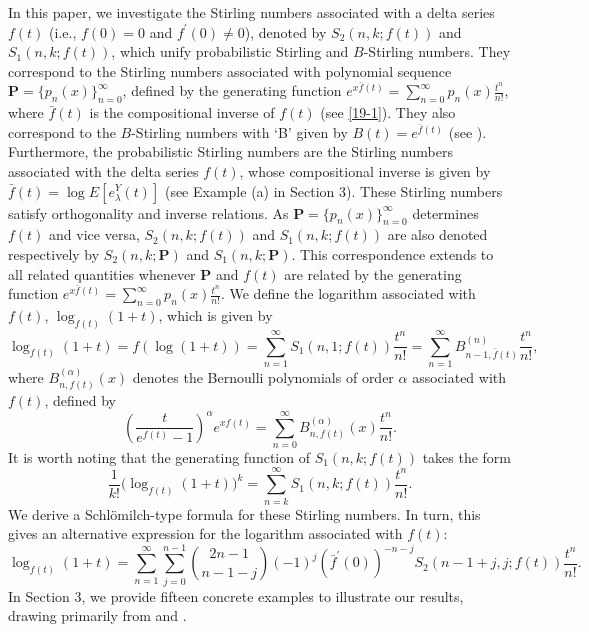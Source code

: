 \documentclass[a4paper,11pt]{amsart}
\begin{document}
In this paper, we investigate the Stirling numbers associated with a delta series $f(t)$ (i.e., $f(0)=0$ and $f^{\prime}(0) \ne 0$), denoted by $S_{2}(n,k; f(t))$ and $S_{1}(n,k; f(t))$, which unify probabilistic Stirling and $B$-Stirling numbers. They correspond to the Stirling numbers associated with polynomial sequence $\mathbf{P}= \{p_{n}(x)\}_{n=0}^{\infty}$, defined by the generating function $e^{x \bar{f}(t)}=\sum_{n=0}^{\infty}p_{n}(x)\frac{t^{n}}{n!}$, where $\bar{f}(t)$ is the compositional inverse of $f(t)$ (see \eqref{19-1}). They also correspond to the $B$-Stirling numbers with `B' given by $B(t)=e^{\bar{f}(t)}$ (see \cite{2}). Furthermore, the probabilistic Stirling numbers are the Stirling numbers associated with the delta series $f(t)$, whose compositional inverse is given by $\bar{f}(t)=\log E[e_{\lambda}^{Y}(t)]$ (see Example (a) in Section 3).
These Stirling numbers satisfy orthogonality and inverse relations. As $\mathbf{P}= \{p_{n}(x)\}_{n=0}^{\infty}$ determines $f(t)$ and vice versa, $S_{2}(n,k; f(t))$ and $S_{1}(n,k; f(t))$ are also denoted respectively by $S_{2}(n,k; \mathbf{P})$ and $S_{1}(n,k; \mathbf{P})$. This correspondence extends to all related quantities whenever $\mathbf{P}$ and $f(t)$ are related by the generating function $e^{x \bar{f}(t)}=\sum_{n=0}^{\infty}p_{n}(x)\frac{t^{n}}{n!}$.
We define the logarithm associated with $f(t)$, $\log_{f(t)}(1+t)$, which is given by
\begin{equation*}
\log_{f(t)}(1+t)=f(\log(1+t))=\sum_{n=1}^{\infty}S_{1}(n,1; f(t))\frac{t^{n}}{n!}=\sum_{n=1}^{\infty}B_{n-1,\bar{f}(t)}^{(n)}\frac{t^{n}}{n!},
\end{equation*}
where $B_{n,f(t)}^{(\alpha)}(x)$ denotes the Bernoulli polynomials of order $\alpha$ associated with $f(t)$, defined by
\begin{equation*}
\left(\frac{t}{e^{f(t)}-1}\right)^{\alpha}e^{xf(t)}=\sum_{n=0}^{\infty}B_{n,f(t)}^{(\alpha)}(x)\frac{t^{n}}{n!}.
\end{equation*}
It is worth noting that the generating function of $S_{1}(n,k; f(t))$ takes the form
\begin{equation*}
\frac{1}{k!}\big(\log_{f(t)}(1+t)\big)^{k}=\sum_{n=k}^{\infty}S_{1}(n,k; f(t))\frac{t^{n}}{n!}.
\end{equation*}
We derive a Schl\"{o}milch-type formula for these Stirling numbers. In turn, this gives an alternative expression for the logarithm associated with $f(t)$:
\begin{equation*}
\log_{f(t)}(1+t)=\sum_{n=1}^{\infty}\sum_{j=0}^{n-1}\binom{2n-1}{n-1-j}(-1)^{j}\left(\bar{f}^{\prime}(0)\right)^{-n-j}S_{2}(n-1+j,j; f(t))\frac{t^{n}}{n!}.
\end{equation*}
In Section 3, we provide fifteen concrete examples to illustrate our results, drawing primarily from \cite{7} and \cite{9}. \par
\end{document}
